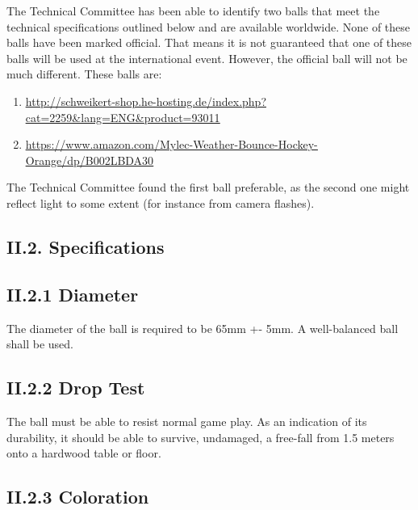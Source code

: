 \documentclass{article}
\begin{document}
\textcolor{color-5}{The Technical Committee has been able to identify two balls that meet the technical specifications outlined below and are available worldwide. None of these balls have been marked official. That means it is not guaranteed that one of these balls will be used at the international event. However, the official ball will not be much different. These balls are:}

\begin{enumerate}[1]

\item \underline{\href{http://schweikert-shop.he-hosting.de/index.php?cat=2259&lang=ENG&product=93011}{http://schweikert-shop.he-hosting.de/index.php?cat=2259\&lang=ENG\&product=93011}}

\item \underline{\href{https://www.amazon.com/Mylec-Weather-Bounce-Hockey-Orange/dp/B002LBDA30}{https://www.amazon.com/Mylec-Weather-Bounce-Hockey-Orange/dp/B002LBDA30}}

\end{enumerate}

\textcolor{color-5}{The Technical Committee found the first ball preferable, as the second one might reflect light to some extent (for instance from camera flashes).}

\subsection{\textcolor{color-5}{II.2. Specifications}} 

\subsection{\textcolor{color-5}{II.2.1 Diameter}} 

\textcolor{color-5}{The diameter of the ball is required to be 65mm +- 5mm. A well-balanced ball shall be used.} 

\subsection{\textcolor{color-5}{II.2.2 Drop Test}} 

\textcolor{color-5}{The ball must be able to resist normal game play. As an indication of its durability, it should be able to survive, undamaged, a free-fall from 1.5 meters onto a hardwood table or floor.}

\subsection{\textcolor{color-5}{II.2.3 Coloration}}
\end{document}

